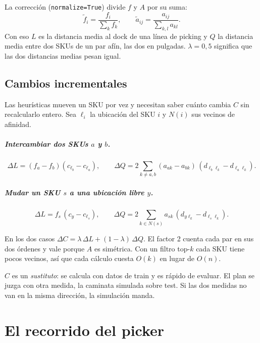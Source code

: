 \documentclass[11pt,a4paper,oneside]{report}
\newcommand{\code}[1]{\texttt{\small #1}}
\begin{document}
La corrección (\code{normalize=True}) divide $f$ y $A$ por su suma:
\[
\tilde f_i = \frac{f_i}{\sum_k f_k}, \qquad \tilde a_{ij} = \frac{a_{ij}}{\sum_{k,l} a_{kl}}.
\]
Con eso $L$ es la distancia media al dock de una línea de picking y $Q$ la distancia media
entre dos SKUs de un par afín, las dos en pulgadas. $\lambda = 0{,}5$ significa que las dos
distancias medias pesan igual.

\section{Cambios incrementales}
\label{sec:deltas}

Las heurísticas mueven un SKU por vez y necesitan saber cuánto cambia $C$ sin recalcularlo
entero. Sea $\ell_i$ la ubicación del SKU $i$ y $N(i)$ sus vecinos de afinidad.

\paragraph{Intercambiar dos SKUs $a$ y $b$.}
\[
\Delta L = (f_a - f_b)(c_{\ell_b} - c_{\ell_a}), \qquad
\Delta Q = 2 \sum_{k \neq a,b} (a_{ak} - a_{bk})\,(d_{\ell_b \ell_k} - d_{\ell_a \ell_k}).
\]

\paragraph{Mudar un SKU $s$ a una ubicación libre $y$.}
\[
\Delta L = f_s\,(c_y - c_{\ell_s}), \qquad
\Delta Q = 2 \sum_{k \in N(s)} a_{sk}\,(d_{y \ell_k} - d_{\ell_s \ell_k}).
\]

En los dos casos $\Delta C = \lambda\, \Delta L + (1-\lambda)\, \Delta Q$. El factor 2 cuenta
cada par en sus dos órdenes y vale porque $A$ es simétrica. Con un filtro top-$k$ cada SKU
tiene pocos vecinos, así que cada cálculo cuesta $O(k)$ en lugar de $O(n)$.

\begin{idea}
$C$ es un \emph{sustituto}: se calcula con datos de train y es rápido de evaluar. El plan se
juzga con otra medida, la caminata simulada sobre test. Si las dos medidas no van en la misma
dirección, la simulación manda.
\end{idea}

\chapter{El recorrido del picker}
\label{cap:ruteo}
\end{document}
